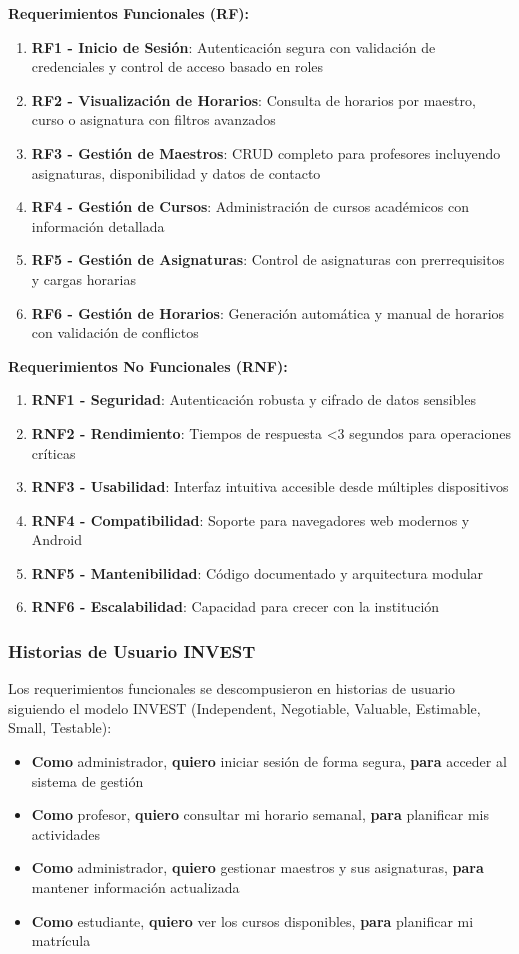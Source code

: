 \textbf{Requerimientos Funcionales (RF):}
\begin{enumerate}
\item \textbf{RF1 - Inicio de Sesión}: Autenticación segura con validación de credenciales y control de acceso basado en roles
\item \textbf{RF2 - Visualización de Horarios}: Consulta de horarios por maestro, curso o asignatura con filtros avanzados
\item \textbf{RF3 - Gestión de Maestros}: CRUD completo para profesores incluyendo asignaturas, disponibilidad y datos de contacto
\item \textbf{RF4 - Gestión de Cursos}: Administración de cursos académicos con información detallada
\item \textbf{RF5 - Gestión de Asignaturas}: Control de asignaturas con prerrequisitos y cargas horarias
\item \textbf{RF6 - Gestión de Horarios}: Generación automática y manual de horarios con validación de conflictos
\end{enumerate}

\textbf{Requerimientos No Funcionales (RNF):}
\begin{enumerate}
\item \textbf{RNF1 - Seguridad}: Autenticación robusta y cifrado de datos sensibles
\item \textbf{RNF2 - Rendimiento}: Tiempos de respuesta <3 segundos para operaciones críticas
\item \textbf{RNF3 - Usabilidad}: Interfaz intuitiva accesible desde múltiples dispositivos
\item \textbf{RNF4 - Compatibilidad}: Soporte para navegadores web modernos y Android
\item \textbf{RNF5 - Mantenibilidad}: Código documentado y arquitectura modular
\item \textbf{RNF6 - Escalabilidad}: Capacidad para crecer con la institución
\end{enumerate}

\subsubsection{Historias de Usuario INVEST}

Los requerimientos funcionales se descompusieron en historias de usuario siguiendo el modelo INVEST (Independent, Negotiable, Valuable, Estimable, Small, Testable):

\begin{itemize}
\item \textbf{Como} administrador, \textbf{quiero} iniciar sesión de forma segura, \textbf{para} acceder al sistema de gestión
\item \textbf{Como} profesor, \textbf{quiero} consultar mi horario semanal, \textbf{para} planificar mis actividades
\item \textbf{Como} administrador, \textbf{quiero} gestionar maestros y sus asignaturas, \textbf{para} mantener información actualizada
\item \textbf{Como} estudiante, \textbf{quiero} ver los cursos disponibles, \textbf{para} planificar mi matrícula
\end{itemize}

